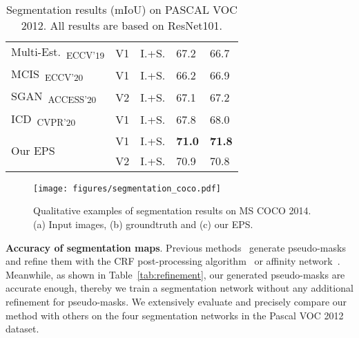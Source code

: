 \documentclass[final]{cvpr}
\begin{document}
\begin{table}[]
{\begin{tabular}{@{}lccll@{}}
\multicolumn{1}{l}{Multi-Est.~\cite{fan2020employing}\textsubscript{ECCV'19}}           & V1        & I.+S. & 67.2                    & 66.7                     \\
\multicolumn{1}{l}{MCIS~\cite{sun2020mining}\textsubscript{ECCV'20}}                    & V1        & I.+S. & 66.2                    & 66.9                     \\
\multicolumn{1}{l}{SGAN~\cite{yao2020saliency}\textsubscript{ACCESS'20}}                & V2        & I.+S. & 67.1                    & 67.2                     \\
\multicolumn{1}{l}{ICD~\cite{fan2020learning}\textsubscript{CVPR'20}}                   & V1        & I.+S. & 67.8                    & 68.0                     \\ \midrule
\multicolumn{1}{l}{\multirow{2}{*}{Our EPS}}                                            & V1        & I.+S. & \textbf{71.0}           & \textbf{71.8}            \\
\multicolumn{1}{l}{}                                                                    & V2        & I.+S. & 70.9                    & 70.8                     \\ \bottomrule
\end{tabular}
}
\vspace{2mm}
\caption{Segmentation results (mIoU) on PASCAL VOC 2012. All results are based on ResNet101.}\vspace{-2mm}
\label{tab:seg_quan_voc_resnet101}
\end{table} \begin{figure*}[t]
\centering
\texttt{[image: figures/segmentation\_coco.pdf]}
\caption{Qualitative examples of segmentation results on MS COCO 2014. (a) Input images, (b) groundtruth and (c) our EPS.}\vspace{-2mm}
\label{fig:seg_qual_coco} 
\end{figure*} 
\vspace{1mm}
\noindent \textbf{Accuracy of segmentation maps}. Previous methods~\cite{ahn2018learning, fan2020learning, wang2020self} generate pseudo-masks and refine them with the CRF post-processing algorithm~\cite{krahenbuhl2011efficient} or affinity network~\cite{ahn2018learning}. Meanwhile, as shown in Table~\ref{tab:refinement}, our generated pseudo-masks are accurate enough, thereby we train a segmentation network without any additional refinement for pseudo-masks. We extensively evaluate and precisely compare our method with others on the four segmentation networks in the Pascal VOC 2012 dataset.
\end{document}

